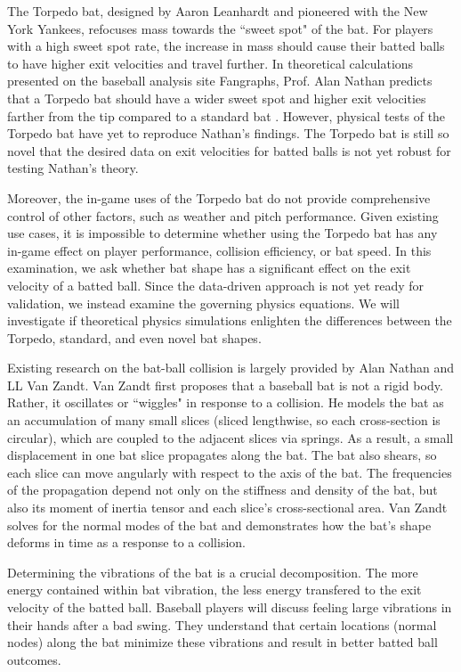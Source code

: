 \documentclass[linenumbers]{aastex7}
\begin{document}
The Torpedo bat, designed by Aaron Leanhardt and pioneered with the New York Yankees, refocuses mass towards the ``sweet spot" of the bat. For players with a high sweet spot rate, the increase in mass should cause their batted balls to have higher exit velocities and travel further. In theoretical calculations presented on the baseball analysis site Fangraphs, Prof. Alan Nathan predicts that a Torpedo bat should have a wider sweet spot and higher exit velocities farther from the tip compared to a standard bat \citep{nathanPhysicsTorpedoBat2025}. However, physical tests of the Torpedo bat have yet to reproduce Nathan's findings. The Torpedo bat is still so novel that the desired data on exit velocities for batted balls is not yet robust for testing Nathan's theory. 

Moreover, the in-game uses of the Torpedo bat do not provide comprehensive control of other factors, such as weather and pitch performance. Given existing use cases, it is impossible to determine whether using the Torpedo bat has any in-game effect on player performance, collision efficiency, or bat speed. In this examination, we ask whether bat shape has a significant effect on the exit velocity of a batted ball. Since the data-driven approach is not yet ready for validation, we instead examine the governing physics equations. We will investigate if theoretical physics simulations enlighten the differences between the Torpedo, standard, and even novel bat shapes.

Existing research on the bat-ball collision is largely provided by Alan Nathan and LL Van Zandt. Van Zandt first proposes that a baseball bat is not a rigid body. Rather, it oscillates or ``wiggles" in response to a collision. He models the bat as an accumulation of many small slices (sliced lengthwise, so each cross-section is circular), which are coupled to the adjacent slices via springs. As a result, a small displacement in one bat slice propagates along the bat. The bat also shears, so each slice can move angularly with respect to the axis of the bat. The frequencies of the propagation depend not only on the stiffness and density of the bat, but also its moment of inertia tensor and each slice's cross-sectional area. Van Zandt solves for the normal modes of the bat and demonstrates how the bat's shape deforms in time as a response to a collision. 

Determining the vibrations of the bat is a crucial decomposition. The more energy contained within bat vibration, the less energy transfered to the exit velocity of the batted ball. Baseball players will discuss feeling large vibrations in their hands after a bad swing. They understand that certain locations (normal nodes) along the bat minimize these vibrations and result in better batted ball outcomes.
\end{document}
